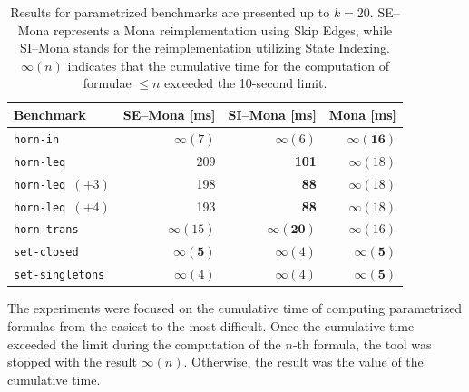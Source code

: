 \documentclass[pdflatex,sn-mathphys-num]{sn-jnl}%
\theoremstyle{thmstyleone}%
\theoremstyle{thmstyletwo}%
\theoremstyle{thmstylethree}%
\begin{document}
        \begin{table}[!h]
            \centering
            \captionsetup{width=\textwidth, justification=justified}
            \small
            \begin{tabular}{|l||r|r|r|}
                \hline
                Benchmark        	& SE--Mona [ms] & SI--Mona [ms] & Mona [ms]\\[0.5ex]
                \hline\hline
                \texttt{horn-in}   & $\infty(7)$  & $\infty(6)$ & \cellcolor{gray!25}$\mathbf{\infty(16)}$ \\[0.5ex]
                \texttt{horn-leq}   & 209  & \cellcolor{gray!25}\textbf{101} & $\infty(18)$ \\[0.5ex]
                \texttt{horn-leq $(+3)$}   & 198  & \cellcolor{gray!25}\textbf{88} & $\infty(18)$ \\[0.5ex]
                \texttt{horn-leq $(+4)$}   & 193  & \cellcolor{gray!25}\textbf{88} & $\infty(18)$ \\[0.5ex]
                \texttt{horn-trans}   & $\infty(15)$  & \cellcolor{gray!25}$\mathbf{\infty(20)}$ & $\infty(16)$ \\[0.5ex]
                \texttt{set-closed}   & \cellcolor{gray!25}$\mathbf{\infty(5)}$  & $\infty(4)$ & \cellcolor{gray!25}$\mathbf{\infty(5)}$ \\[0.5ex]
                \texttt{set-singletons}   & $\infty(4)$  & $\infty(4)$ & \cellcolor{gray!25}$\mathbf{\infty(5)}$ \\[0.5ex]

                \hline
            \end{tabular}
            \normalsize
            \vspace*{0.5em}
            \caption{Results for parametrized benchmarks are presented up to $k = 20$. SE--Mona represents a Mona reimplementation using Skip Edges, while SI--Mona stands for the reimplementation utilizing State Indexing. $\infty(n)$ indicates that the cumulative time for the computation of formulae $\leq n$ exceeded the 10-second limit.}
            \label{table}
        \end{table}

        The experiments were focused on the cumulative time of computing parametrized formulae from the easiest to the most difficult. Once the cumulative time exceeded the limit during the computation of the $n$-th formula, the tool was stopped with the result $\infty(n)$. Otherwise, the result was the value of the cumulative time.
\end{document}
